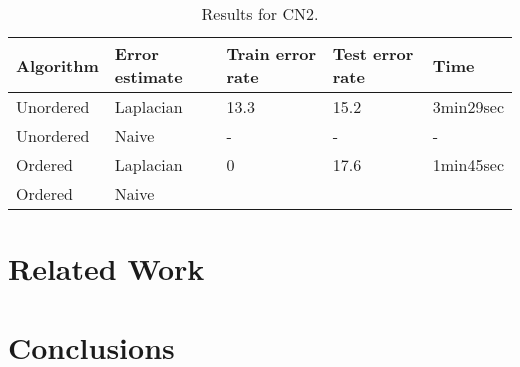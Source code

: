 \documentclass[a4paper]{llncs}
\begin{document}
\begin{table}
\begin{center}
\begin{tabular}{ | l | l | l | l | l |}
    \hline
    \textbf{Algorithm} & \textbf{Error estimate} & \textbf{Train error rate} & \textbf{Test error rate} & \textbf{Time} \\ \hline
    Unordered & Laplacian & 13.3 & 15.2 & 3min29sec \\ \hline
    Unordered & Naive & - & - & - \\ \hline
    Ordered & Laplacian & 0 & 17.6 & 1min45sec \\ \hline
    Ordered & Naive &
\end{tabular}
\caption{Results for CN2.}
\label{tbl:results_cn2}
\end{center}
\end{table}

\section{Related Work}

\section{Conclusions}
\end{document}
